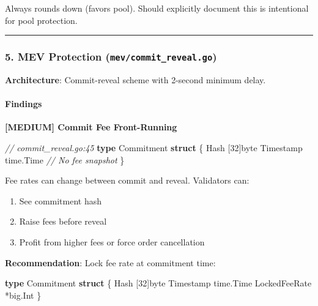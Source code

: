 \documentclass[
]{article}
\newenvironment{Shaded}{}{}
\newcommand{\CommentTok}[1]{\textcolor[rgb]{0.38,0.63,0.69}{\textit{#1}}}
\newcommand{\DataTypeTok}[1]{\textcolor[rgb]{0.56,0.13,0.00}{#1}}
\newcommand{\DecValTok}[1]{\textcolor[rgb]{0.25,0.63,0.44}{#1}}
\newcommand{\KeywordTok}[1]{\textcolor[rgb]{0.00,0.44,0.13}{\textbf{#1}}}
\newcommand{\NormalTok}[1]{#1}
\newcommand{\OperatorTok}[1]{\textcolor[rgb]{0.40,0.40,0.40}{#1}}
\providecommand{\tightlist}{%
  \setlength{\itemsep}{0pt}\setlength{\parskip}{0pt}}
\begin{document}
Always rounds down (favors pool). Should explicitly document this is
intentional for pool protection.

\begin{center}\rule{0.5\linewidth}{0.5pt}\end{center}

\subsubsection{\texorpdfstring{5. MEV Protection
(\texttt{mev/commit\_reveal.go})}{5. MEV Protection (mev/commit\_reveal.go)}}\label{5-mev-protection-mevcommit_revealgo}

\textbf{Architecture}: Commit-reveal scheme with 2-second minimum delay.

\paragraph{Findings}\label{findings-4}

\textbf{{[}MEDIUM{]} Commit Fee Front-Running}

\begin{Shaded}
\begin{Highlighting}[]
\CommentTok{// commit\_reveal.go:45}
\KeywordTok{type}\NormalTok{ Commitment }\KeywordTok{struct} \OperatorTok{\{}
\NormalTok{    Hash      }\OperatorTok{[}\DecValTok{32}\OperatorTok{]}\DataTypeTok{byte}
\NormalTok{    Timestamp time}\OperatorTok{.}\NormalTok{Time}
    \CommentTok{// No fee snapshot}
\OperatorTok{\}}
\end{Highlighting}
\end{Shaded}

Fee rates can change between commit and reveal. Validators can:

\begin{enumerate}
\def\labelenumi{\arabic{enumi}.}
\tightlist
\item
  See commitment hash
\item
  Raise fees before reveal
\item
  Profit from higher fees or force order cancellation
\end{enumerate}

\textbf{Recommendation}: Lock fee rate at commitment time:

\begin{Shaded}
\begin{Highlighting}[]
\KeywordTok{type}\NormalTok{ Commitment }\KeywordTok{struct} \OperatorTok{\{}
\NormalTok{    Hash         }\OperatorTok{[}\DecValTok{32}\OperatorTok{]}\DataTypeTok{byte}
\NormalTok{    Timestamp    time}\OperatorTok{.}\NormalTok{Time}
\NormalTok{    LockedFeeRate }\OperatorTok{*}\NormalTok{big}\OperatorTok{.}\NormalTok{Int}
\OperatorTok{\}}
\end{Highlighting}
\end{Shaded}
\end{document}
